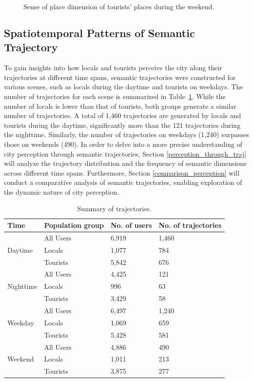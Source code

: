 \documentclass{article}
\theoremstyle{remark}
\begin{document}
\begin{figure}[!h]
    \caption{Sense of place dimension of tourists' places during the weekend.}
    \label{fig:places_topics_sense_tourists_weekend}
\end{figure}


\subsection{Spatiotemporal Patterns of Semantic Trajectory} \label{patterns_traj}
To gain insights into how locals and tourists perceive the city along their trajectories at different time spans, semantic trajectories were constructed for various scenes, such as locals during the daytime and tourists on weekdays. The number of trajectories for each scene is summarized in Table~\ref{tab:trajectories_summary}. While the number of locals is lower than that of tourists, both groups generate a similar number of trajectories. A total of 1,460 trajectories are generated by locals and tourists during the daytime, significantly more than the 121 trajectories during the nighttime. Similarly, the number of trajectories on weekdays (1,240) surpasses those on weekends (490). In order to delve into a more precise understanding of city perception through semantic trajectories, Section \ref{perception_through_traj} will analyze the trajectory distribution and the frequency of semantic dimensions across different time spans. Furthermore, Section \ref{comparison_perception} will conduct a comparative analysis of semantic trajectories, enabling exploration of the dynamic nature of city perception.

\begin{table}[h!]
\centering
\caption{\label{tab:trajectories_summary}Summary of trajectories.}
\begin{tabular}{llll} \hline
Time & Population group & No. of users & No. of trajectories \\
\hline
\multirow{3}{*}{Daytime} 
& All Users & 6,919 & 1,460 \\
& Locals & 1,077 & 784 \\
& Tourists & 5,842 & 676 \\
\hline
\multirow{3}{*}{Nighttime} 
& All Users & 4,425 & 121 \\
& Locals & 996 & 63 \\
& Tourists & 3,429 & 58 \\
\hline
\multirow{3}{*}{Weekday} 
& All Users & 6,497 & 1,240 \\
& Locals & 1,069 & 659 \\
& Tourists & 5,428 & 581 \\
\hline
\multirow{3}{*}{Weekend} 
& All Users & 4,886 & 490 \\
& Locals & 1,011 & 213 \\
& Tourists & 3,875 & 277 \\
\hline
\end{tabular}
\end{table}
\end{document}
